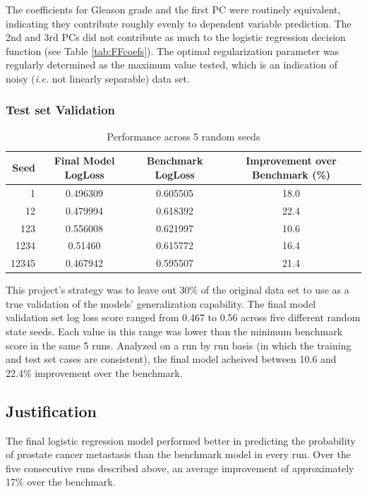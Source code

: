 \documentclass[final]{article}
\begin{document}
The coefficients for Gleason grade and the first PC were routinely equivalent,
indicating they contribute roughly evenly to dependent variable prediction.  The
2nd and 3rd PCs did not contribute as much to the logistic regression decision
function (see Table \ref{tab:FFcoefs}).  The optimal regularization parameter
was regularly determined as the maximum value tested, which is an indication of
noisy (\textit{i.e.} not linearly separable) data set.


\subsubsection{Test set Validation}

\begin{table}[h]
\centering
\caption{Performance across 5 random seeds\label{tab:performance}}
\begin{tabular}[h]{ r c c c }
\hline
Seed & Final Model LogLoss & Benchmark LogLoss & Improvement over Benchmark (\%) \\  \hline
1 & 0.496309 & 0.605505 & 18.0 \\
12 & 0.479994 & 0.618392 & 22.4 \\
123 & 0.556008 & 0.621997 & 10.6 \\
1234 & 0.51460 & 0.615772 & 16.4 \\
12345 & 0.467942 & 0.595507 & 21.4 \\
\hline
\end{tabular}
\end{table}

This project's strategy was to leave out 30\% of the original data set to use as a
true validation of the models' generalization capability.  The final model validation
set log loss score ranged from 0.467 to 0.56 across five different random state
seeds.  Each value in this range was lower than the minimum benchmark score in the
same 5 runs.  Analyzed on a run by run basis (in which the training and test set cases
are consistent), the final model acheived between 10.6 and 22.4\% improvement over
the benchmark.

\subsection{Justification}

The final logistic regression model performed better in predicting the
probability of prostate cancer  metastasis than the benchmark model in every
run.  Over the five consecutive runs described above, an average improvement of
approximately 17\%  over the benchmark.
\end{document}
